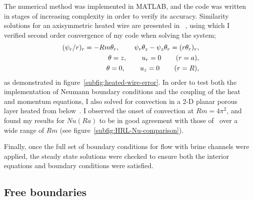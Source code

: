 \documentclass[11pt,twocolumn]{article}
\begin{document}
The numerical method was implemented in MATLAB, and the code was written in stages of increasing complexity in order to verify its accuracy. Similarity solutions for an axisymmetric heated wire are presented in ~\citet*[Chapter~5.9]{nield-bejan-06}, using which I verified second order convergence of my code when solving the system;
\begin{eqnarray}
&&(\psi_r/r)_r = -Rm \theta_r, \hspace{5ex} \psi_r \theta_z - \psi_z \theta_r = (r \theta_r)_r, \\
&&\theta = z, \hspace{5ex} u_r = 0 \hspace{5ex} (r=a), \\
&&\theta = 0, \hspace{5ex} u_z = 0 \hspace{5ex} (r=R),
\end{eqnarray}
as demonstrated in figure~\ref{subfig:heated-wire-error}. In order to test both the implementation of Neumann boundary conditions and the coupling of the heat and momentum equations, I also solved for convection in a 2-D planar porous layer heated from below~\citep*{horton-rogers-45,lapwood-48}. I observed the onset of convection at $Rm = 4 \pi^2$, and found my results for $Nu(Ra)$ to be in good agreement with those of~\citet*{caltagirone-75} over a wide range of $Rm$ (see figure~\ref{subfig:HRL-Nu-comparison}).

Finally, once the full set of boundary conditions for flow with brine channels were applied, the steady state solutions were checked to ensure both the interior equations and boundary conditions were satisfied.

\subsection{Free boundaries}
\label{sec:free-boundary-method}
\end{document}
